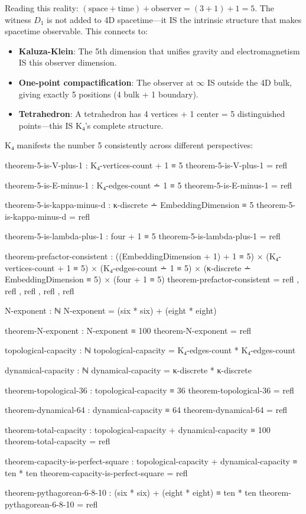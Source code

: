 \documentclass[11pt,a4paper]{book}
\begin{document}
Reading this reality: $(\text{space} + \text{time}) + \text{observer} = (3 + 1) + 1 = 5$.
The witness $D_1$ is not added to 4D spacetime—it IS the intrinsic structure that makes spacetime observable. This connects to:

\begin{itemize}
\item \textbf{Kaluza-Klein}: The 5th dimension that unifies gravity and electromagnetism IS this observer dimension.
\item \textbf{One-point compactification}: The observer at $\infty$ IS outside the 4D bulk, giving exactly 5 positions (4 bulk + 1 boundary).
\item \textbf{Tetrahedron}: A tetrahedron has 4 vertices + 1 center = 5 distinguished points—this IS K₄'s complete structure.
\end{itemize}

K₄ manifests the number 5 consistently across different perspectives:

\begin{code}
theorem-5-is-V-plus-1 : K₄-vertices-count + 1 ≡ 5
theorem-5-is-V-plus-1 = refl

theorem-5-is-E-minus-1 : K₄-edges-count ∸ 1 ≡ 5
theorem-5-is-E-minus-1 = refl

theorem-5-is-kappa-minus-d : κ-discrete ∸ EmbeddingDimension ≡ 5
theorem-5-is-kappa-minus-d = refl

theorem-5-is-lambda-plus-1 : four + 1 ≡ 5
theorem-5-is-lambda-plus-1 = refl

theorem-prefactor-consistent : 
  ((EmbeddingDimension + 1) + 1 ≡ 5) ×
  (K₄-vertices-count + 1 ≡ 5) ×
  (K₄-edges-count ∸ 1 ≡ 5) ×
  (κ-discrete ∸ EmbeddingDimension ≡ 5) ×
  (four + 1 ≡ 5)
theorem-prefactor-consistent = refl , refl , refl , refl , refl
\end{code}

\begin{code}
N-exponent : ℕ
N-exponent = (six * six) + (eight * eight)

theorem-N-exponent : N-exponent ≡ 100
theorem-N-exponent = refl

topological-capacity : ℕ
topological-capacity = K₄-edges-count * K₄-edges-count

dynamical-capacity : ℕ
dynamical-capacity = κ-discrete * κ-discrete

theorem-topological-36 : topological-capacity ≡ 36
theorem-topological-36 = refl

theorem-dynamical-64 : dynamical-capacity ≡ 64
theorem-dynamical-64 = refl

theorem-total-capacity : topological-capacity + dynamical-capacity ≡ 100
theorem-total-capacity = refl

theorem-capacity-is-perfect-square : topological-capacity + dynamical-capacity ≡ ten * ten
theorem-capacity-is-perfect-square = refl

theorem-pythagorean-6-8-10 : (six * six) + (eight * eight) ≡ ten * ten
theorem-pythagorean-6-8-10 = refl
\end{code}
\end{document}
